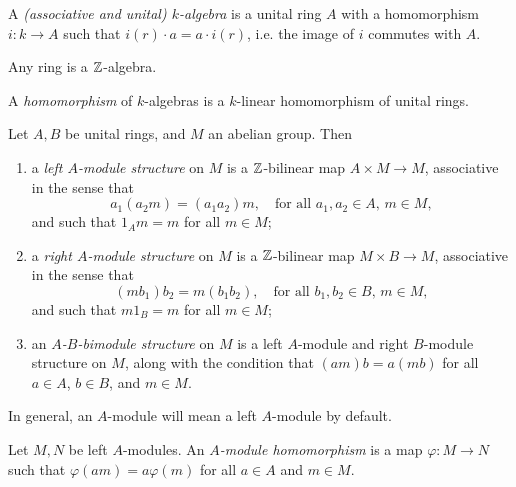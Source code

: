 \begin{definition}
  A \emph{(associative and unital) $k$-algebra}
  is a unital ring $A$ with a homomorphism
  $i : k \to A$ such that
  $i(r) \cdot a = a \cdot i(r)$, i.e. the
  image of $i$ commutes with $A$.
\end{definition}

\begin{example}
  Any ring is a $\mathbb{Z}$-algebra.
\end{example}

\begin{definition}
  A \emph{homomorphism} of $k$-algebras is a
  $k$-linear homomorphism of unital rings.
\end{definition}

\begin{definition}
  Let $A, B$ be unital rings, and $M$ an
  abelian group. Then
  \begin{enumerate}
    \item a \emph{left $A$-module structure}
      on $M$ is a $\mathbb{Z}$-bilinear map
      $A \times M \to M$, associative in
      the sense that
      \[
        a_1(a_2 m) = (a_1 a_2) m, \quad
        \text{for all } a_1, a_2 \in A,\, m \in M,
      \]
      and such that $1_A m = m$ for all $m \in M$;
    \item a \emph{right $A$-module structure}
      on $M$ is a $\mathbb{Z}$-bilinear map
      $M \times B \to M$, associative in
      the sense that
      \[
        (m b_1) b_2 = m (b_1 b_2), \quad
        \text{for all } b_1, b_2 \in B,\, m \in M,
      \]
      and such that $m 1_B = m$ for all $m \in M$;
    \item an \emph{$A$-$B$-bimodule structure}
      on $M$ is a left $A$-module and
      right $B$-module structure on $M$,
      along with the condition that
      $(am) b = a(mb)$ for all
      $a \in A$, $b \in B$, and $m \in M$.
  \end{enumerate}
\end{definition}

\begin{remark}
In general, an $A$-module will mean a left $A$-module by default.
\end{remark}

\begin{definition}
  Let $M, N$ be left $A$-modules.
  An \emph{$A$-module homomorphism} is a map
  $\varphi : M \to N$ such that
  $\varphi(am) = a \varphi(m)$ for all
  $a \in A$ and $m \in M$.
\end{definition}

